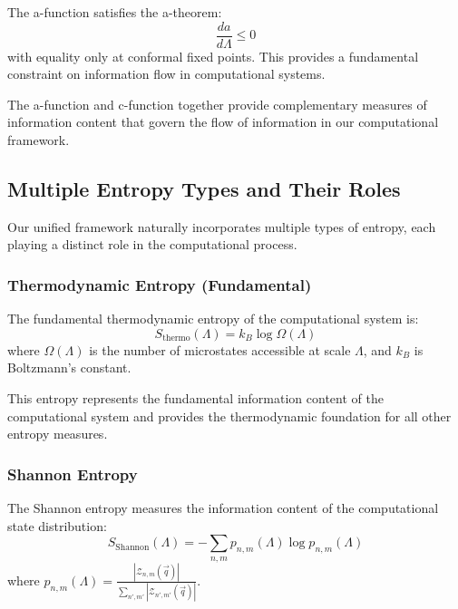 \begin{theorem}
\begin{theorem}
\label{thm:a-function-monotonicity}
The a-function satisfies the a-theorem:
\[
\frac{da}{d\Lambda} \leq 0
\]
with equality only at conformal fixed points. This provides a fundamental constraint on information flow in computational systems.
\end{theorem}

The a-function and c-function together provide complementary measures of information content that govern the flow of information in our computational framework.

\subsection{Multiple Entropy Types and Their Roles}

Our unified framework naturally incorporates multiple types of entropy, each playing a distinct role in the computational process.

\subsubsection{Thermodynamic Entropy (Fundamental)}

\begin{definition}
\label{def:thermodynamic-entropy}
The fundamental thermodynamic entropy of the computational system is:
\[
S_{\text{thermo}}(\Lambda) = k_B \log \Omega(\Lambda)
\]
where $\Omega(\Lambda)$ is the number of microstates accessible at scale $\Lambda$, and $k_B$ is Boltzmann's constant.
\end{definition}

This entropy represents the fundamental information content of the computational system and provides the thermodynamic foundation for all other entropy measures.

\subsubsection{Shannon Entropy}

\begin{definition}
\label{def:shannon-entropy}
The Shannon entropy measures the information content of the computational state distribution:
\[
S_{\text{Shannon}}(\Lambda) = -\sum_{n,m} p_{n,m}(\Lambda) \log p_{n,m}(\Lambda)
\]
where $p_{n,m}(\Lambda) = \frac{|\mathcal{Z}_{n,m}(\vec{q})|}{\sum_{n',m'} |\mathcal{Z}_{n',m'}(\vec{q})|}$.
\end{definition}


\end{theorem}
